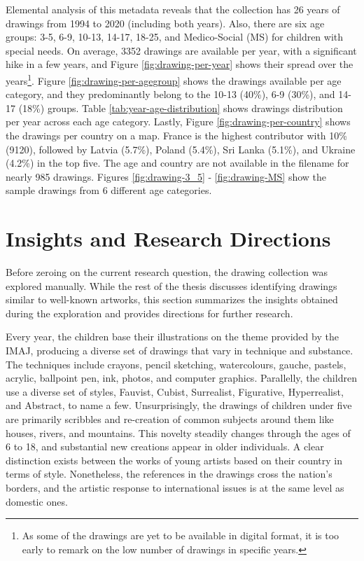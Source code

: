 Elemental analysis of this metadata reveals that the collection has 26 years of drawings from 1994 to 2020 (including both years). Also, there are six age groups: 3-5, 6-9, 10-13, 14-17, 18-25, and Medico-Social (MS) for children with special needs. On average, 3352 drawings are available per year, with a significant hike in a few years, and Figure \ref{fig:drawing-per-year} shows their spread over the years\footnote{As some of the drawings are yet to be available in digital format, it is too early to remark on the low number of drawings in specific years.}. Figure \ref{fig:drawing-per-agegroup} shows the drawings available per age category, and they predominantly belong to the 10-13 (40\%), 6-9 (30\%), and 14-17 (18\%) groups. Table \ref{tab:year-age-distribution} shows drawings distribution per year across each age category. Lastly, Figure \ref{fig:drawing-per-country} shows the drawings per country on a map. France is the highest contributor with 10\% (9120), followed by Latvia (5.7\%), Poland (5.4\%), Sri Lanka (5.1\%), and Ukraine (4.2\%) in the top five. The age and country are not available in the filename for nearly 985 drawings. Figures \ref{fig:drawing-3_5} - \ref{fig:drawing-MS} show the sample drawings from 6 different age categories.

\section{Insights and Research Directions}\label{chap:3:sec:research-dir}
Before zeroing on the current research question, the drawing collection was explored manually. While the rest of the thesis discusses identifying drawings similar to well-known artworks, this section summarizes the insights obtained during the exploration and provides directions for further research.

Every year, the children base their illustrations on the theme provided by the IMAJ, producing a diverse set of drawings that vary in technique and substance. The techniques include crayons, pencil sketching, watercolours, gauche, pastels, acrylic, ballpoint pen, ink, photos, and computer graphics. Parallelly, the children use a diverse set of styles, Fauvist, Cubist, Surrealist, Figurative, Hyperrealist, and Abstract, to name a few. Unsurprisingly, the drawings of children under five are primarily scribbles and re-creation of common subjects around them like houses, rivers, and mountains. This novelty steadily changes through the ages of 6 to 18, and substantial new creations appear in older individuals. A clear distinction exists between the works of young artists based on their country in terms of style. Nonetheless, the references in the drawings cross the nation's borders, and the artistic response to international issues is at the same level as domestic ones.


